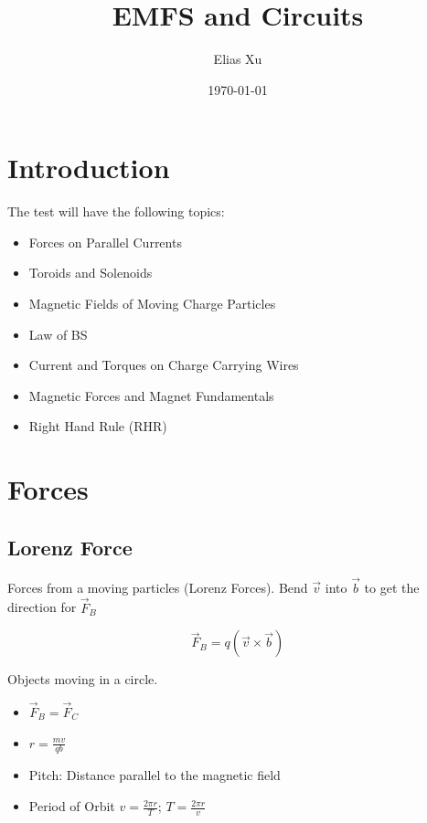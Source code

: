\documentclass{article}
\begin{document}
\title{EMFS and Circuits}
\author{Elias Xu}
\date{\today}
\maketitle
\setlength{\parindent}{0pt}

\tableofcontents

\section{Introduction}

The test will have the following topics:

\begin{itemize}
    \item Forces on Parallel Currents
    \item Toroids and Solenoids
    \item Magnetic Fields of Moving Charge Particles
    \item Law of BS
    \item Current and Torques on Charge Carrying Wires
    \item Magnetic Forces and Magnet Fundamentals
    \item Right Hand Rule (RHR)
\end{itemize}

\section{Forces}

\subsection{Lorenz Force}

Forces from a moving particles (Lorenz Forces). Bend $\vec{v}$ into $\vec{b}$ to get the direction for $\vec{F}_B$

\[\vec{F}_B = q(\vec{v} \times \vec{b})\]

Objects moving in a circle.

\begin{itemize}
    \item $\vec{F}_B = \vec{F}_C$
    \item $r = \frac{mv}{qb}$
    \item Pitch: Distance parallel to the magnetic field
    \item Period of Orbit $v = \frac{2\pi r}{T}$; $T = \frac{2 \pi r}{v}$
\end{itemize}
\end{document}
